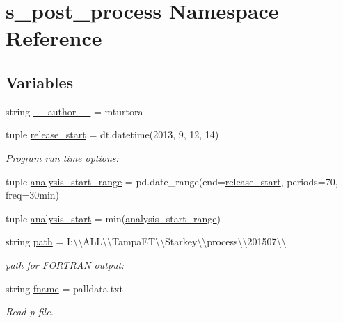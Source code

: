 \hypertarget{namespaces__post__process}{}\section{s\+\_\+post\+\_\+process Namespace Reference}
\label{namespaces__post__process}
\subsection*{Variables}
\begin{DoxyCompactItemize}
\item 
string \hyperlink{namespaces__post__process_a48359acf9272ab2ce01abc37dcd5229d}{\+\_\+\+\_\+author\+\_\+\+\_\+} = \textquotesingle{}mturtora\textquotesingle{}
\item 
tuple \hyperlink{namespaces__post__process_a5629689e4c1b3e73d3894e6d6741d57e}{release\+\_\+start} = dt.\+datetime(2013, 9, 12, 14)
\begin{DoxyCompactList}\small\item\em Program run time options\+: \end{DoxyCompactList}\item 
tuple \hyperlink{namespaces__post__process_a651eea1bf0f6d80a22819e1f99c7d72e}{analysis\+\_\+start\+\_\+range} = pd.\+date\+\_\+range(end=\hyperlink{namespaces__post__process_a5629689e4c1b3e73d3894e6d6741d57e}{release\+\_\+start}, periods=70, freq=\textquotesingle{}30min\textquotesingle{})
\item 
tuple \hyperlink{namespaces__post__process_a47acdf72893f9a03b4829dcaeed5bbb7}{analysis\+\_\+start} = min(\hyperlink{namespaces__post__process_a651eea1bf0f6d80a22819e1f99c7d72e}{analysis\+\_\+start\+\_\+range})
\item 
string \hyperlink{namespaces__post__process_a57eb09f6e1e700924ee93b619e0ee863}{path} = \textquotesingle{}I\+:\textbackslash{}\textbackslash{}\+A\+L\+L\textbackslash{}\textbackslash{}\+Tampa\+E\+T\textbackslash{}\textbackslash{}\+Starkey\textbackslash{}\textbackslash{}process\textbackslash{}\textbackslash{}201507\textbackslash{}\textbackslash{}\textquotesingle{}
\begin{DoxyCompactList}\small\item\em path for F\+O\+R\+T\+R\+A\+N output\+: \end{DoxyCompactList}\item 
string \hyperlink{namespaces__post__process_a21843322f9c0bc1447e3fcf8b98c75f1}{fname} = \textquotesingle{}palldata.\+txt\textquotesingle{}
\begin{DoxyCompactList}\small\item\em Read p file. \end{DoxyCompactList}\item 

\end{DoxyCompactItemize}
